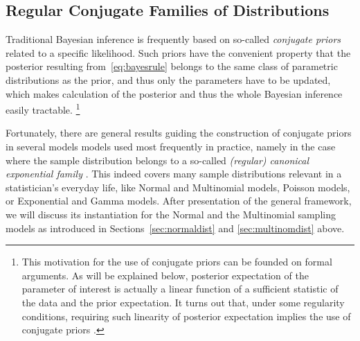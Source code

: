 \subsection{Regular Conjugate Families of Distributions}
\label{sec:regularconjugates}

Traditional Bayesian inference is frequently based on so-called \emph{conjugate priors} related to a specific likelihood.
Such priors have the convenient property that the posterior resulting from~\eqref{eq:bayesrule}
belongs to the same class of parametric distributions as the prior, and thus only the parameters have to be updated,
which makes calculation of the posterior and thus the whole Bayesian inference easily tractable.%
\footnote{This motivation for the use of conjugate priors can be founded on formal arguments.
As will be explained below, posterior expectation of the parameter of interest
is actually a linear function of a sufficient statistic of the data and the prior expectation.
It turns out that, under some regularity conditions, requiring such linearity of posterior expectation
implies the use of conjugate priors \parencite[p.~276]{2000:bernardosmith}.}

Fortunately, there are general results guiding the construction of conjugate priors in several models models used most frequently in practice,
namely in the case where the sample distribution belongs to a so-called \emph{(regular) canonical exponential family}
\parencite[e.g.,][pp.~202 and 272f]{2000:bernardosmith}. %
This indeed covers many sample distributions relevant in a statistician's everyday life,
like Normal and Multinomial models, Poisson models, or Exponential and Gamma models.
After presentation of the general framework, we will discuss its instantiation for the Normal
and the Multinomial sampling models as introduced in Sections~\ref{sec:normaldist} and \ref{sec:multinomdist} above.

